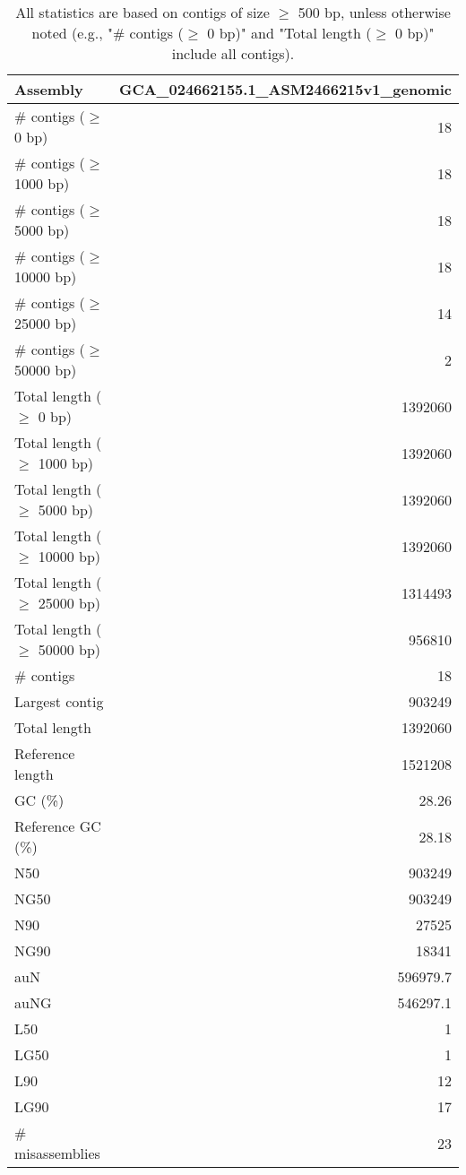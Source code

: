 \documentclass[12pt,a4paper]{article}
\begin{document}
\begin{table}[ht]
\begin{center}
\caption{All statistics are based on contigs of size $\geq$ 500 bp, unless otherwise noted (e.g., "\# contigs ($\geq$ 0 bp)" and "Total length ($\geq$ 0 bp)" include all contigs).}
\begin{tabular}{|l*{1}{|r}|}
\hline
Assembly & GCA\_024662155.1\_ASM2466215v1\_genomic \\ \hline
\# contigs ($\geq$ 0 bp) & 18 \\ \hline
\# contigs ($\geq$ 1000 bp) & 18 \\ \hline
\# contigs ($\geq$ 5000 bp) & 18 \\ \hline
\# contigs ($\geq$ 10000 bp) & 18 \\ \hline
\# contigs ($\geq$ 25000 bp) & 14 \\ \hline
\# contigs ($\geq$ 50000 bp) & 2 \\ \hline
Total length ($\geq$ 0 bp) & 1392060 \\ \hline
Total length ($\geq$ 1000 bp) & 1392060 \\ \hline
Total length ($\geq$ 5000 bp) & 1392060 \\ \hline
Total length ($\geq$ 10000 bp) & 1392060 \\ \hline
Total length ($\geq$ 25000 bp) & 1314493 \\ \hline
Total length ($\geq$ 50000 bp) & 956810 \\ \hline
\# contigs & 18 \\ \hline
Largest contig & 903249 \\ \hline
Total length & 1392060 \\ \hline
Reference length & 1521208 \\ \hline
GC (\%) & 28.26 \\ \hline
Reference GC (\%) & 28.18 \\ \hline
N50 & 903249 \\ \hline
NG50 & 903249 \\ \hline
N90 & 27525 \\ \hline
NG90 & 18341 \\ \hline
auN & 596979.7 \\ \hline
auNG & 546297.1 \\ \hline
L50 & 1 \\ \hline
LG50 & 1 \\ \hline
L90 & 12 \\ \hline
LG90 & 17 \\ \hline
\# misassemblies & 23 \\ \hline

\end{tabular}
\end{center}
\end{table}
\end{document}
